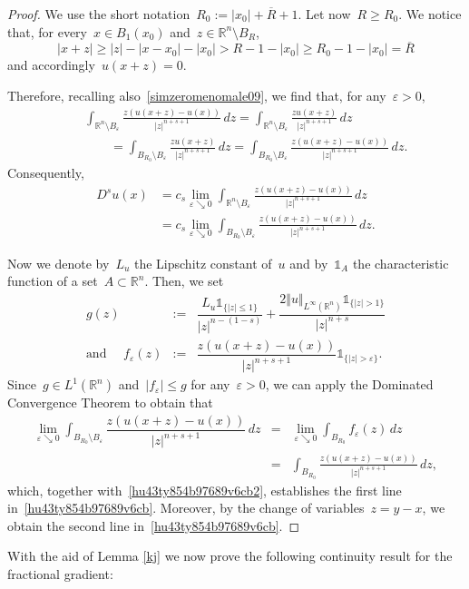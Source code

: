 \documentclass[11pt,hyp,]{nyjm}
\numberwithin{equation}{section}
\newcommand{\R}{\mathbb{R}}
\theoremstyle{remark}
\renewcommand{\leq}{\leqslant}
\renewcommand{\ge}{\geqslant}
\renewcommand{\epsilon}{\varepsilon}
\begin{document}
			\begin{proof} We use the short notation~$R_0:=|x_0|+ \overline R+1$. Let now~$R\ge R_0$.
			We notice that, for every~$x\in B_1(x_0)$ and~$z\in\R^n\setminus B_R$,
			$$|x+z|\ge|z|-|x-x_0|-|x_0|>R-1-|x_0|\ge R_0-1-|x_0|=\overline R$$
			and accordingly~$u(x+z)=0$.
			
			Therefore, recalling also~\eqref{simzeromenomale09}, we find that, for any~$\epsilon>0$,
\begin{eqnarray*}
&&\int_{\R^n \setminus B_{\epsilon}} \frac{z (u(x+z)-u(x))}{|z|^{n+s+1}} \, dz
= \int_{\R^n \setminus B_{\epsilon}} \frac{z u(x+z)}{|z|^{n+s+1}} \, dz\\&&\qquad
= \int_{B_{R_0} \setminus B_{\epsilon}} \frac{z u(x+z)}{|z|^{n+s+1}} \, dz=
\int_{B_{R_0} \setminus B_{\epsilon}} \frac{z (u(x+z)-u(x))}{|z|^{n+s+1}} \, dz.
\end{eqnarray*}
			Consequently,
\begin{equation}\label{hu43ty854b97689v6cb2}\begin{split}
				D^s u(x) &= c_{s}  \lim_{\epsilon \searrow 0} \int_{\R^n \setminus B_{\epsilon}} \frac{z (u(x+z)-u(x))}{|z|^{n+s+1}} \, dz \\&=  c_{s}  \lim_{\epsilon \searrow 0} \int_{B_{R_0} \setminus B_{\epsilon}} \frac{z (u(x+z)-u(x))}{|z|^{n+s+1}} \, dz.\end{split}
\end{equation}
				
Now we denote by~$L_u$ the Lipschitz constant of~$u$ and by~$\mathds{1}_{A}$ the characteristic function of a set~$A\subset\R^n$. Then, we set
				\begin{eqnarray*}
					g(z)&:= &\dfrac{L_u\mathds{1}_{\{|z|\leq 1\}}}{|z|^{n-(1-s)}} + \dfrac{2 \Vert u \Vert_{L^{\infty}(\R^n)} \mathds{1}_{\{|z|>1\}}}{|z|^{n+s}}
				\\{\mbox{and }}\quad  
	f_{\epsilon}(z)&:=&\dfrac{z(u(x+z)-u(x))}{|z|^{n+s+1}} \mathds{1}_{\{|z|> \varepsilon\}}.\end{eqnarray*}
Since~$g \in L^1(\R^n)$ and~$|f_\epsilon| \leq g$ for any~$\varepsilon>0$, we can apply the Dominated Convergence Theorem to obtain that				
\begin{eqnarray*} \lim_{\epsilon \searrow 0}
\int_{B_{R_0} \setminus B_{\epsilon}}   \dfrac{z(u(x+z)-u(x))}{|z|^{n+s+1}} \, dz &=&
					\lim_{\epsilon \searrow 0}  \int_{B_{R_0}} f_\epsilon(z) \, dz   \\&=&  \int_{B_{R_0}}  \frac{z(u(x+z)-u(x))}{|z|^{n+s+1}} \, dz,    
\end{eqnarray*}
which, together with~\eqref{hu43ty854b97689v6cb2}, establishes
the first line in~\eqref{hu43ty854b97689v6cb}.
Moreover, by the change of variables~$z= y-x$, we obtain the second line in~\eqref{hu43ty854b97689v6cb}.
			\end{proof}  With the aid of Lemma \ref{kj} we now prove the following continuity result for the fractional gradient:
			
\end{document}
